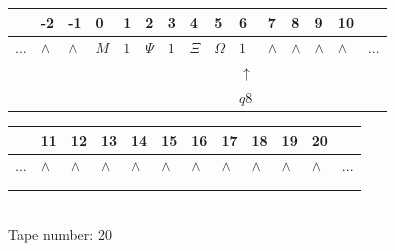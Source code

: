 \documentclass[11pt]{article}
\begin{document}
\begin{table}[H]
\centering
\begin{tabular}{lllllllllllllll}
 & -2 & -1 & 0 & 1 & 2 & 3 & 4 & 5 & 6 & 7 & 8 & 9 & 10 & \\
\hline
$...$ & \multicolumn{1}{|l|}{$\wedge$} & \multicolumn{1}{|l|}{$\wedge$} & \multicolumn{1}{|l|}{$M$} & \multicolumn{1}{|l|}{$1$} & \multicolumn{1}{|l|}{$\Psi$} & \multicolumn{1}{|l|}{$1$} & \multicolumn{1}{|l|}{$\Xi$} & \multicolumn{1}{|l|}{$\Omega$} & \multicolumn{1}{|l|}{$1$} & \multicolumn{1}{|l|}{$\wedge$} & \multicolumn{1}{|l|}{$\wedge$} & \multicolumn{1}{|l|}{$\wedge$} & \multicolumn{1}{|l|}{$\wedge$} & $...$\\
\hline
&  &  &  &  &  &  &  &  & $\uparrow$ &  &  &  &  &  \\
&  &  &  &  &  &  &  &  & $ q8 $ &  &  &  &  &  \\
\end{tabular}
\begin{tabular}{llllllllllll}
 & 11 & 12 & 13 & 14 & 15 & 16 & 17 & 18 & 19 & 20 & \\
\hline
$...$ & \multicolumn{1}{|l|}{$\wedge$} & \multicolumn{1}{|l|}{$\wedge$} & \multicolumn{1}{|l|}{$\wedge$} & \multicolumn{1}{|l|}{$\wedge$} & \multicolumn{1}{|l|}{$\wedge$} & \multicolumn{1}{|l|}{$\wedge$} & \multicolumn{1}{|l|}{$\wedge$} & \multicolumn{1}{|l|}{$\wedge$} & \multicolumn{1}{|l|}{$\wedge$} & \multicolumn{1}{|l|}{$\wedge$} & $...$\\
\hline
&  &  &  &  &  &  &  &  &  &  &  \\
&  &  &  &  &  &  &  &  &  &  &  \\
\end{tabular}
\\
Tape number: 20
\noindent\makebox[\linewidth]{\hdashrule{\textwidth}{1pt}{1pt}}\end{table}
\end{document}
